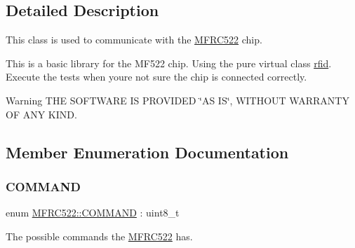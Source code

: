 \subsection{Detailed Description}
This class is used to communicate with the \mbox{\hyperlink{class_m_f_r_c522}{M\+F\+R\+C522}} chip. 

This is a basic library for the M\+F522 chip. Using the pure virtual class \mbox{\hyperlink{classrfid}{rfid}}. Execute the tests when you\textquotesingle{}re not sure the chip is connected correctly. \begin{DoxyWarning}{Warning}
T\+HE S\+O\+F\+T\+W\+A\+RE IS P\+R\+O\+V\+I\+D\+ED \char`\"{}\+A\+S I\+S\char`\"{}, W\+I\+T\+H\+O\+UT W\+A\+R\+R\+A\+N\+TY OF A\+NY K\+I\+ND. 
\end{DoxyWarning}


\subsection{Member Enumeration Documentation}
\mbox{\label{class_m_f_r_c522_abf038692c9cf33ed59b44a612e6ed1c7}} 
\subsubsection{\texorpdfstring{C\+O\+M\+M\+A\+ND}{COMMAND}}
{\footnotesize\ttfamily enum \mbox{\hyperlink{class_m_f_r_c522_abf038692c9cf33ed59b44a612e6ed1c7}{M\+F\+R\+C522\+::\+C\+O\+M\+M\+A\+ND}} \+: uint8\+\_\+t}



The possible commands the \mbox{\hyperlink{class_m_f_r_c522}{M\+F\+R\+C522}} has. 

